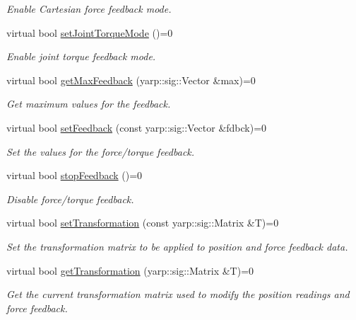 \begin{DoxyCompactItemize}
\begin{DoxyCompactList}\small\item\em Enable Cartesian force feedback mode. \end{DoxyCompactList}\item 
virtual bool \hyperlink{classhapticdevice_1_1IHapticDevice_a1246d82f600bcf16118b0be5f4a7087e}{set\+Joint\+Torque\+Mode} ()=0
\begin{DoxyCompactList}\small\item\em Enable joint torque feedback mode. \end{DoxyCompactList}\item 
virtual bool \hyperlink{classhapticdevice_1_1IHapticDevice_a976cc05cb22404a017f877837c82fc8e}{get\+Max\+Feedback} (yarp\+::sig\+::\+Vector \&max)=0
\begin{DoxyCompactList}\small\item\em Get maximum values for the feedback. \end{DoxyCompactList}\item 
virtual bool \hyperlink{classhapticdevice_1_1IHapticDevice_a77685dcf029136b739ae54ed8045e220}{set\+Feedback} (const yarp\+::sig\+::\+Vector \&fdbck)=0
\begin{DoxyCompactList}\small\item\em Set the values for the force/torque feedback. \end{DoxyCompactList}\item 
virtual bool \hyperlink{classhapticdevice_1_1IHapticDevice_a65fccacec1cfa0208c8952f7063a7b6b}{stop\+Feedback} ()=0
\begin{DoxyCompactList}\small\item\em Disable force/torque feedback. \end{DoxyCompactList}\item 
virtual bool \hyperlink{classhapticdevice_1_1IHapticDevice_aef306f97632c1ddb0eb39383000616f4}{set\+Transformation} (const yarp\+::sig\+::\+Matrix \&T)=0
\begin{DoxyCompactList}\small\item\em Set the transformation matrix to be applied to position and force feedback data. \end{DoxyCompactList}\item 
virtual bool \hyperlink{classhapticdevice_1_1IHapticDevice_a9bbb65a62a31e0f52f21c2eb13671483}{get\+Transformation} (yarp\+::sig\+::\+Matrix \&T)=0
\begin{DoxyCompactList}\small\item\em Get the current transformation matrix used to modify the position readings and force feedback. \end{DoxyCompactList}\end{DoxyCompactItemize}


